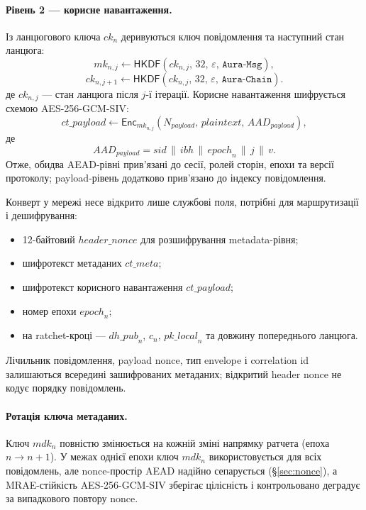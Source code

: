 \documentclass[11pt,a4paper]{article}
\theoremstyle{definition}
\newcommand{\HKDF}{\textsf{HKDF}}
\newcommand{\AEAD}{\textsf{AES-256-GCM-SIV}}
\newcommand{\Enc}{\textsf{Enc}}
\newcommand{\concat}{\ensuremath{\,\|\,}}
\newcommand{\ck}{\ensuremath{\mathit{ck}}}
\newcommand{\mk}{\ensuremath{\mathit{mk}}}
\newcommand{\mdk}{\ensuremath{\mathit{mdk}}}
\newcommand{\epochv}{\ensuremath{\mathit{epoch}}}
\begin{document}
\paragraph{Рівень 2 — корисне навантаження.}
Із ланцюгового ключа $\ck_n$ деривуються ключ повідомлення та наступний
стан ланцюга:
\begin{equation}\label{eq:message-key-derive}
  \mk_{n,j} \gets \HKDF(\ck_{n,j},\,32,\,\varepsilon,\,
    \texttt{Aura-Msg}),
\end{equation}
\begin{equation}\label{eq:chain-key-derive}
  \ck_{n,j+1} \gets \HKDF(\ck_{n,j},\,32,\,\varepsilon,\,
    \texttt{Aura-Chain}).
\end{equation}
де $\ck_{n,j}$ — стан ланцюга після $j$-ї ітерації. Корисне навантаження
шифрується схемою \AEAD{}:
\begin{equation}\label{eq:payload-aead}
  \mathit{ct\_payload} \gets \Enc_{\mk_{n,j}}(N_{\mathit{payload}},\,
  \mathit{plaintext},\, \mathit{AAD}_{\mathit{payload}}),
\end{equation}
де
\begin{equation}\label{eq:payload-aad}
  \mathit{AAD}_{\mathit{payload}}
  = \mathit{sid} \concat \mathit{ibh} \concat \epochv_n \concat j \concat v.
\end{equation}
Отже, обидва AEAD-рівні прив'язані до сесії, ролей сторін, епохи та
версії протоколу; payload-рівень додатково прив'язано до індексу
повідомлення.

Конверт у мережі несе відкрито лише службові поля, потрібні для маршрутизації
і дешифрування:
\begin{itemize}
  \item 12-байтовий $\mathit{header\_nonce}$ для розшифрування metadata-рівня;
  \item шифротекст метаданих $\mathit{ct\_meta}$;
  \item шифротекст корисного навантаження $\mathit{ct\_payload}$;
  \item номер епохи $\epochv_n$;
  \item на ratchet-кроці — $\mathit{dh\_pub}_n$, $c_n$,
    $\mathit{pk\_local}_n$ та довжину попереднього ланцюга.
\end{itemize}
Лічильник повідомлення, payload nonce, тип envelope і correlation id
залишаються всередині зашифрованих метаданих; відкритий header nonce не
кодує порядку повідомлень.

\paragraph{Ротація ключа метаданих.}
Ключ $\mdk_n$ повністю змінюється на кожній зміні напрямку ратчета
(епоха $n \to n+1$). У межах однієї епохи ключ $\mdk_n$ використовується
для всіх повідомлень, але nonce-простір AEAD надійно сепарується
(\S\ref{sec:nonce}), а MRAE-стійкість \AEAD{} зберігає цілісність і
контрольовано деградує за випадкового повтору nonce.
\end{document}
